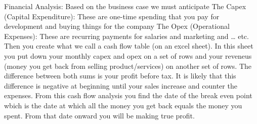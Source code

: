 Financial Analysis: Based on the business case we must anticipate 
The Capex (Capital Expenditure):  These are one-time spending that you pay for development and buying things for the company
The Opex (Operational Expenses): These are recurring payments for salaries and marketing and … etc.
Then you create what we call a cash flow table (on an excel sheet). In this sheet you put down your monthly capex and opex on a set of rows and your reveneus (money you get back from selling product/services) on another set of rows.
The difference between both sums is your profit before tax.
It is likely that this difference is negative at beginning until your sales increase and counter the expenses.
From this cash flow analysis you find the date of the break even point wbich is the date at which all the money you get back equals the money you spent. From that date onward you will be making true profit.
